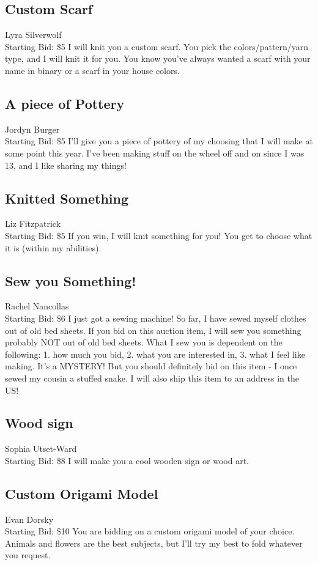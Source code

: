 \documentclass[11pt]{article}
\begin{document}
\subsection{Custom Scarf}
Lyra Silverwolf
\\
Starting Bid: \$5
\newline
I will knit you a custom scarf. You pick the colors/pattern/yarn type, and I will knit it for you. You know you've always wanted a scarf with your name in binary or a scarf in your house colors.
\subsection{A piece of Pottery}
Jordyn Burger
\\
Starting Bid: \$5
\newline
I'll give you a piece of pottery of my choosing that I will make at some point this year. I've been making stuff on the wheel off and on since I was 13, and I like sharing my things!
\subsection{Knitted Something}
Liz Fitzpatrick
\\
Starting Bid: \$5
\newline
If you win, I will knit something for you! You get to choose what it is (within my abilities).
\subsection{Sew you Something!}
Rachel Nancollas
\\
Starting Bid: \$6
\newline
I just got a sewing machine! So far, I have sewed myself clothes out of old bed sheets. If you bid on this auction item, I will sew you something probably NOT out of old bed sheets. What I sew you is dependent on the following: 1. how much you bid, 2. what you are interested in, 3. what I feel like making. It's a MYSTERY! But you should definitely bid on this item - I once sewed my cousin a stuffed snake. I will also ship this item to an address in the US!
\subsection{Wood sign}
Sophia Utset-Ward
\\
Starting Bid: \$8
\newline
I will make you a cool wooden sign or wood art.
\subsection{Custom Origami Model}
Evan Dorsky
\\
Starting Bid: \$10
\newline
You are bidding on a custom origami model of your choice. Animals and flowers are the best subjects, but I'll try my best to fold whatever you request.
\end{document}
